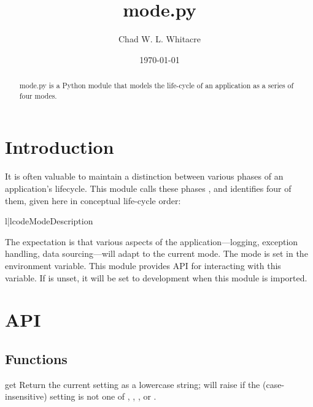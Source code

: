 \documentclass{manual}
\title{mode.py}
\author{Chad W. L. Whitacre}
\date\today
\begin{document}
\maketitle

\begin{abstract}

\noindent
mode.py is a Python module that models the life-cycle of an application as a
series of four modes.

\end{abstract}

\chapter{Introduction}

It is often valuable to maintain a distinction between various phases of an
application's lifecycle. This module calls these phases , and
identifies four of them, given here in conceptual life-cycle order:

\begin{tableii}{l|l}{code}{Mode}{Description}
\end{tableii}


The expectation is that various aspects of the application---logging, exception
handling, data sourcing---will adapt to the current mode. The mode is set in the
 environment variable. This module provides API for
interacting with this variable. If  is unset, it will be set
to development when this module is imported.

\chapter{API}

\section{Functions}

\begin{funcdesc}{get}{}
Return the current  setting as a lowercase string; will raise
 if the (case-insensitive) setting is not one of
, , , or .
\end{funcdesc}
\end{document}
